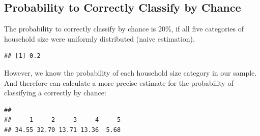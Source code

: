 \documentclass[]{article}
\newenvironment{Shaded}{\begin{snugshade}}{\end{snugshade}}
\newcommand{\KeywordTok}[1]{\textcolor[rgb]{0.13,0.29,0.53}{\textbf{#1}}}
\newcommand{\DataTypeTok}[1]{\textcolor[rgb]{0.13,0.29,0.53}{#1}}
\newcommand{\DecValTok}[1]{\textcolor[rgb]{0.00,0.00,0.81}{#1}}
\newcommand{\StringTok}[1]{\textcolor[rgb]{0.31,0.60,0.02}{#1}}
\newcommand{\OtherTok}[1]{\textcolor[rgb]{0.56,0.35,0.01}{#1}}
\newcommand{\ControlFlowTok}[1]{\textcolor[rgb]{0.13,0.29,0.53}{\textbf{#1}}}
\newcommand{\OperatorTok}[1]{\textcolor[rgb]{0.81,0.36,0.00}{\textbf{#1}}}
\newcommand{\NormalTok}[1]{#1}
\begin{document}
\subsection{Probability to Correctly Classify by
Chance}\label{probability-to-correctly-classify-by-chance}

The probability to correctly classify by chance is 20\%, if all five
categories of household size were uniformly distributed (naive
estimation).

\begin{Shaded}
\end{Shaded}

\begin{verbatim}
## [1] 0.2
\end{verbatim}

However, we know the probability of each household size category in our
sample. And therefore can calculate a more precise estimate for the
probability of classifying a correctly by chance:

\begin{Shaded}
\end{Shaded}

\begin{verbatim}
## 
##     1     2     3     4     5 
## 34.55 32.70 13.71 13.36  5.68
\end{verbatim}
\end{document}
